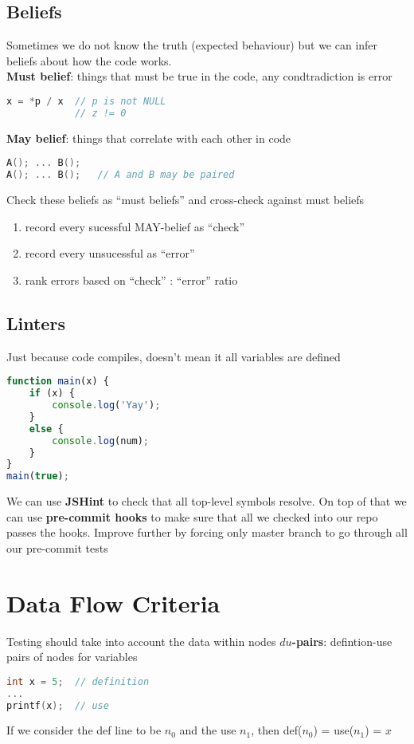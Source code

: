 \documentclass[]{article}
\theoremstyle{definition}
\begin{document}
		\subsection{Beliefs}
			Sometimes we do not know the truth (expected behaviour) but we can infer beliefs about how the code works. \\ 
			\newline
			\textbf{Must belief}: things that must be true in the code, any condtradiction is error
			\begin{lstlisting}[language=C]
x = *p / x	// p is not NULL
			// z != 0
			\end{lstlisting}
			\textbf{May belief}: things that correlate with each other in code
			\begin{lstlisting}[language=C]
A(); ... B();
A(); ... B();	// A and B may be paired
			\end{lstlisting}
			Check these beliefs as ``must beliefs'' and cross-check against must beliefs
			\begin{enumerate}
				\item record every sucessful MAY-belief as ``check''
				\item record every unsucessful as ``error''
				\item rank errors based on ``check'' : ``error'' ratio
			\end{enumerate}
		\subsection{Linters}
			Just because code compiles, doesn't mean it all variables are defined
			\begin{lstlisting}[language=Javascript]
function main(x) {
	if (x) {
		console.log('Yay');
	}
	else {
		console.log(num);
	}
}
main(true);
			\end{lstlisting}
			We can use \textbf{JSHint} to check that all top-level symbols resolve. On top of that we can use \textbf{pre-commit hooks} to make sure that all we checked into our repo passes the hooks. Improve further by forcing only master branch to go through all our pre-commit tests
	\section{Data Flow Criteria}
		Testing should take into account the data within nodes
		\textbf{$du$-pairs}: defintion-use pairs of nodes for variables
		\begin{lstlisting}[language=C]
int x = 5;	// definition
...
printf(x);	// use
		\end{lstlisting}
		If we consider the def line to be $n_0$ and the use $n_1$, then def($n_0$) = use($n_1$) = ${x}$
\end{document}
